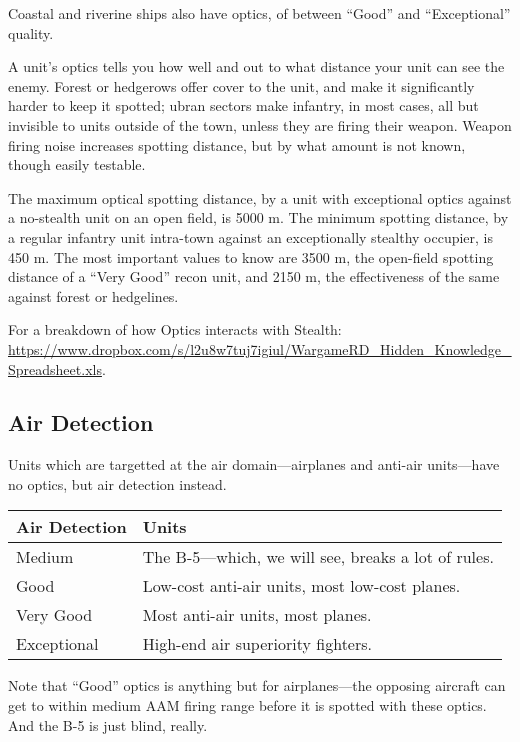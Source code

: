 \documentclass{article}
\begin{document}
Coastal and riverine ships also have optics, of between ``Good'' and
``Exceptional'' quality.

A unit's optics tells you how well and out to what distance your unit can see
the enemy. Forest or hedgerows offer cover to the unit, and make it
significantly harder to keep it spotted; ubran sectors make infantry, in most
cases, all but invisible to units outside of the town, unless they are firing
their weapon. Weapon firing noise increases spotting distance, but by what
amount is not known, though easily testable.

The maximum optical spotting distance, by a unit with exceptional optics
against a no-stealth unit on an open field, is 5000 m. The minimum spotting
distance, by a regular infantry unit intra-town against an exceptionally
stealthy occupier, is 450 m. The most important values to know are 3500 m, the
open-field spotting distance of a ``Very Good'' recon unit, and 2150 m, the
effectiveness of the same against forest or hedgelines.

For a breakdown of how Optics interacts with Stealth: 
\url{https://www.dropbox.com/s/l2u8w7tuj7igiul/WargameRD_Hidden_Knowledge_Spreadsheet.xls}.

\subsection{Air Detection}

Units which are targetted at the air domain---airplanes and anti-air
units---have no optics, but air detection instead.

\begin{center}
    \begin{tabular}{ | l | l | }
    \hline
    Air Detection & Units \\ \hline
    Medium & The B-5---which, we will see, breaks a lot of rules.\\
    Good & Low-cost anti-air units, most low-cost planes.\\
    Very Good & Most anti-air units, most planes.\\
    Exceptional & High-end air superiority fighters.\\
    \hline
    \end{tabular}
\end{center}

Note that ``Good'' optics is
anything but for airplanes---the opposing aircraft can get to within
medium AAM firing range before it is spotted with these optics. And the B-5 is
just blind, really.
\end{document}
